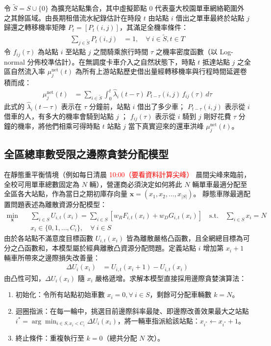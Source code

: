 令 $\tilde{S} = S \cup \{0\}$ 為擴充站點集合，其中虛擬節點 $0$ 代表臺大校園單車網絡範圍外之其餘區域。由長期租借流水紀錄估計在時段 $t$ 由站點 $i$ 借出之單車最終於站點 $j$ 歸還之轉移機率矩陣 $P_t = \left[P_t(i, j)\right]$，其滿足全機率條件：
\begin{align}
\sum_{j \in \tilde{S}} P_t(i, j) &= 1, \quad \forall\ i \in \tilde{S}, t \in T
\end{align}
令 $f_{ij}(\tau)$ 為站點 $i$ 至站點 $j$ 之間騎乘旅行時間 $\tau$ 之機率密度函數（以 Log-normal 分佈校準估計）。在無調度卡車介入之自然狀態下，時點 $t$ 抵達站點 $j$ 之全區自然流入率 $\mu^{\text{net}}_j(t)$ 為所有上游站點歷史借出量經轉移機率與行程時間延遲卷積而成：
\begin{align}
\mu^{\text{net}}_j(t) &= \sum_{i \in \tilde{S}} \int_{0}^{t} \hat{\lambda}_i(t - \tau) \, P_{t-\tau}(i, j) \, f_{ij}(\tau) \, d\tau
\end{align}
此式的 $\hat{\lambda}_i(t - \tau)$ 表示在 $\tau$ 分鐘前，站點 $i$ 借出了多少車； $P_{t-\tau}(i, j)$ 表示從 $i$ 借車的人，有多大的機率會騎到站點 $j$ ； $f_{ij}(\tau)$ 表示從 $i$ 騎到 $j$ 剛好花費 $\tau$ 分鐘的機率，將他們相乘可得時點 $t$ 站點 $j$ 當下真實迎來的還車洪峰 $\mu^{\text{net}}_j(t)$。

\subsection{全區總車數受限之邊際貪婪分配模型}\label{subsec:greedy_fleet_allocation}

在靜態重平衡情境（例如每日清晨 \textcolor{red}{10:00（要看資料計算尖峰）} 晨間尖峰來臨前，全校可用單車總數固定為 $N$ 輛），營運商必須決定如何將此 $N$ 輛單車最適分配至全區各大站點，作為當日之期初庫存向量 $\mathbf{x} = (x_1, x_2, \dots, x_{|S|})$。
靜態車隊最適配置問題表述為離散資源分配模型：
\begin{equation}
\boxed{
\begin{aligned}
\min_{\mathbf{x}} \quad & \sum_{i \in S} U_{i,t}(x_i) = \sum_{i \in S} \left[ w_R F_{i,t}(x_i) + w_D G_{i,t}(x_i) \right] \quad \text{s.t.} \quad \sum_{i \in S} x_i = N \\
& x_i \in \{0, 1, \dots, C_i\}, \quad \forall\ i \in S
\end{aligned}
}
\end{equation}
由於各站點不滿意度目標函數 $U_{i,t}(x_i)$ 皆為離散嚴格凸函數，且全網總目標為可分之凸函數和，本模型屬於經典離散凸資源分配問題。定義站點 $i$ 增加第 $x_i + 1$ 輛車所帶來之邊際損失改善量：
\begin{align}
\Delta U_i(x_i) &= U_{i,t}(x_i + 1) - U_{i,t}(x_i)
\end{align}
由凸性可知，$\Delta U_i(x_i)$ 隨 $x_i$ 嚴格遞增。求解本模型直接採用邊際貪婪演算法：
\begin{enumerate}
    \item 初始化：令所有站點初始車數 $x_i = 0, \forall\ i \in S$，剩餘可分配車輛數 $k = N$。
    \item 迴圈指派：在每一輪中，挑選目前邊際斜率最陡、即邊際改善效果最大之站點 $i^* = \arg\min_{i \in S, x_i < C_i} \Delta U_i(x_i)$，將一輛車指派給該站點：$x_{i^*} \leftarrow x_{i^*} + 1$。
    \item 終止條件：重複執行至 $k = 0$（總共分配 $N$ 次）。
\end{enumerate}

